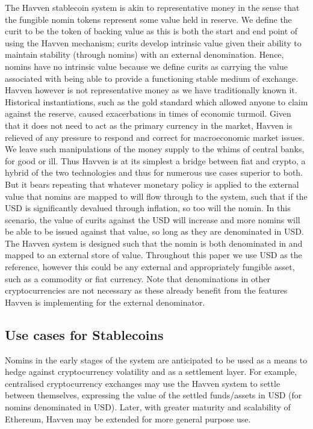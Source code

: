 \noindent The Havven stablecoin system is akin to representative money in the sense that the fungible nomin
tokens represent some value held in reserve. We define the curit to be the token of backing value as this is
both the start and end point of using the Havven mechanism; curits develop intrinsic value given their ability
to maintain stability (through nomins) with an external denomination. Hence, nomins have no intrinsic value
because we define curits as carrying the value associated with being able to provide a functioning stable
medium of exchange. \\

\noindent Havven however is not representative money as we have traditionally known it. Historical instantiations,
such as the gold standard which allowed anyone to claim against the reserve, caused exacerbations in times of
economic turmoil. Given that it does not need to act as the primary currency in the market, Havven is relieved
of any pressure to respond and correct for macroeconomic market issues. We leave such manipulations of the money
supply to the whims of central banks, for good or ill. Thus Havven is at its simplest a bridge between fiat and
crypto, a hybrid of the two technologies and thus for numerous use cases superior to both. But it bears
repeating that whatever monetary policy is applied to the external value that nomins are mapped to will
flow through to the system, such that if the USD is significantly devalued through inflation, so too will the
nomin. In this scenario, the value of curits against the USD will increase and more nomins will be able to be
issued against that value, so long as they are denominated in USD. \\

\noindent The Havven system is designed such that the nomin is both denominated in and
mapped to an external store of value. Throughout this paper we use USD as the reference, however this could
be any external and appropriately fungible asset, such as a commodity or fiat currency. Note that denominations
in other cryptocurrencies are not necessary as these already benefit from the features Havven is implementing
for the external denominator. \\

\subsection{Use cases for Stablecoins}

\noindent Nomins in the early stages of the system are anticipated to be used as a means to hedge against
cryptocurrency volatility and as a settlement layer. For example, centralised cryptocurrency exchanges may
use the Havven system to settle between themselves, expressing the value of the settled funds/assets in USD
(for nomins denominated in USD). Later, with greater maturity and scalability of Ethereum, Havven may be
extended for more general purpose use. \\

\pagebreak
